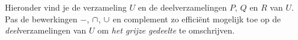 \begin{oef}
Hieronder vind je de verzameling $U$ en de deelverzamelingen $P$, $Q$ en $R$ van $U$. Pas de bewerkingen $-$, $\cap$, $\cup$ en complement zo effici\"ent mogelijk toe op de \emph{deel}verzamelingen van $U$ om \emph{het grijze gedeelte} te omschrijven.
\begin{multicols}{2}
\begin{enumerate}

\begin{minipage}{\columnwidth}
\item
\centering

\end{minipage}

\begin{minipage}{\columnwidth}
\item
\centering

\end{minipage}

\begin{minipage}{\columnwidth}
\item
\centering

\end{minipage}

\begin{minipage}{\columnwidth}
\item
\centering

\end{minipage}

\begin{minipage}{\columnwidth}
\item
\centering

\end{minipage}

\begin{minipage}{\columnwidth}
\item
\centering

\end{minipage}

\end{enumerate}
\end{multicols}


\end{oef}
